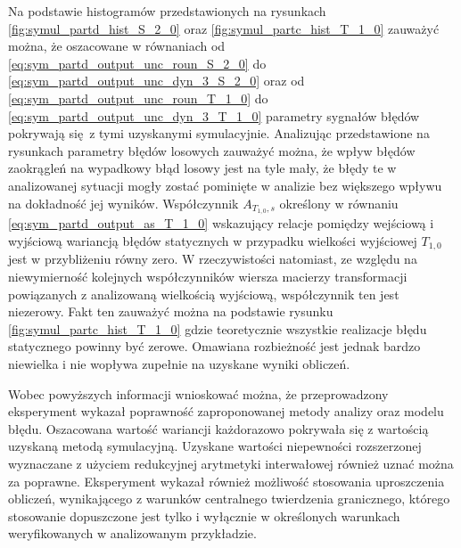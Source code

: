 Na podstawie histogramów przedstawionych na rysunkach \ref{fig:symul_partd_hist_S_2_0} oraz \ref{fig:symul_partc_hist_T_1_0} zauważyć można, że oszacowane w równaniach od \eqref{eq:sym_partd_output_unc_roun_S_2_0} do \eqref{eq:sym_partd_output_unc_dyn_3_S_2_0} oraz od \eqref{eq:sym_partd_output_unc_roun_T_1_0} do \eqref{eq:sym_partd_output_unc_dyn_3_T_1_0} parametry sygnałów błędów pokrywają się z tymi uzyskanymi symulacyjnie. Analizując przedstawione na rysunkach parametry błędów losowych zauważyć można, że wpływ błędów zaokrągleń na wypadkowy błąd losowy jest na tyle mały, że błędy te w analizowanej sytuacji mogły zostać pominięte w analizie bez większego wpływu na dokładność jej wyników. Współczynnik $A_{T_{1,0},s} $ określony w równaniu \eqref{eq:sym_partd_output_as_T_1_0} wskazujący relacje pomiędzy wejściową i wyjściową wariancją błędów statycznych w przypadku wielkości wyjściowej $T_{1,0}$ jest w przybliżeniu równy zero. W rzeczywistości natomiast, ze względu na niewymierność kolejnych współczynników wiersza macierzy transformacji powiązanych z analizowaną wielkością wyjściową, współczynnik ten jest niezerowy. Fakt ten zauważyć można na podstawie rysunku \ref{fig:symul_partc_hist_T_1_0} gdzie teoretycznie wszystkie realizacje błędu statycznego powinny być zerowe. Omawiana rozbieżność jest jednak bardzo niewielka i nie wopływa zupełnie na uzyskane wyniki obliczeń.

Wobec powyższych informacji wnioskować można, że przeprowadzony eksperyment wykazał poprawność zaproponowanej metody analizy oraz modelu błędu. Oszacowana wartość wariancji każdorazowo pokrywała się z wartością uzyskaną metodą symulacyjną. Uzyskane wartości niepewności rozszerzonej wyznaczane z użyciem redukcyjnej arytmetyki interwałowej również uznać można za poprawne. Eksperyment wykazał również możliwość stosowania uproszczenia obliczeń, wynikającego z warunków centralnego twierdzenia granicznego, którego stosowanie dopuszczone jest tylko i wyłącznie w określonych warunkach weryfikowanych w analizowanym przykładzie.

